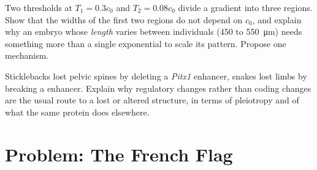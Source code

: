 \begin{exercise}[$\star\star\star$]\label{exo:b3:developmental-genetics:11}
Two thresholds at $T_{1} = 0.3c_{0}$ and $T_{2} = 0.08c_{0}$ divide a
gradient into three regions. Show that the widths of the first two
regions do not depend on $c_{0}$, and explain why an embryo whose
\emph{length} varies between individuals (\qty{450}{} to
\qty{550}{\micro m}) needs something more than a single exponential to
scale its pattern. Propose one mechanism.
\end{exercise}

\begin{exercise}[$\star\star\star$]\label{exo:b3:developmental-genetics:12}
Sticklebacks lost pelvic spines by deleting a \emph{Pitx1} enhancer,
snakes lost limbs by breaking a \emph{} enhancer. Explain
why regulatory changes rather than coding changes are the usual route
to a lost or altered structure, in terms of pleiotropy and of what the
same protein does elsewhere.
\end{exercise}

\section{Problem: The French Flag}

